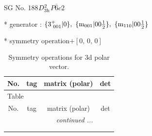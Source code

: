 \documentclass[fleqn,8pt]{jsarticle}
\begin{document}
\setcounter{MaxMatrixCols}{32}

\renewcommand{\tablename}{Table~}
\renewcommand{\figurename}{Figure~}
\begin{center}
\LARGE
SG No. 188\quad$D_{\rm 3h}^{2}$\quad$P\bar{6}c2$\quad[ hexagonal ]
\end{center}

* generator : $\{3^{+}_{\,\,001}|0\},\,\,\{{\rm m}_{001}|0 0 \frac{1}{2}\},\,\,\{{\rm m}_{110}|0 0 \frac{1}{2}\}$

* symmetry operation\quad$+\left[ 0,\, 0,\, 0 \right]$
\renewcommand{\arraystretch}{1.3}
\begin{longtable}{cccc}
\caption{Symmetry operations for 3d polar vector.}
 \\
 \hline \hline
No. & tag & matrix (polar) & det \\ \hline \endfirsthead

\multicolumn{3}{l}{\tablename\ \thetable{}} \\
 \hline \hline
No. & tag & matrix (polar) & det \\ \hline \endhead

 \hline \hline
\multicolumn{3}{r}{\footnotesize\it continued ...} \\ \endfoot

 \hline \hline
\multicolumn{3}{r}{} \\ \endlastfoot


\end{longtable}
\end{document}
